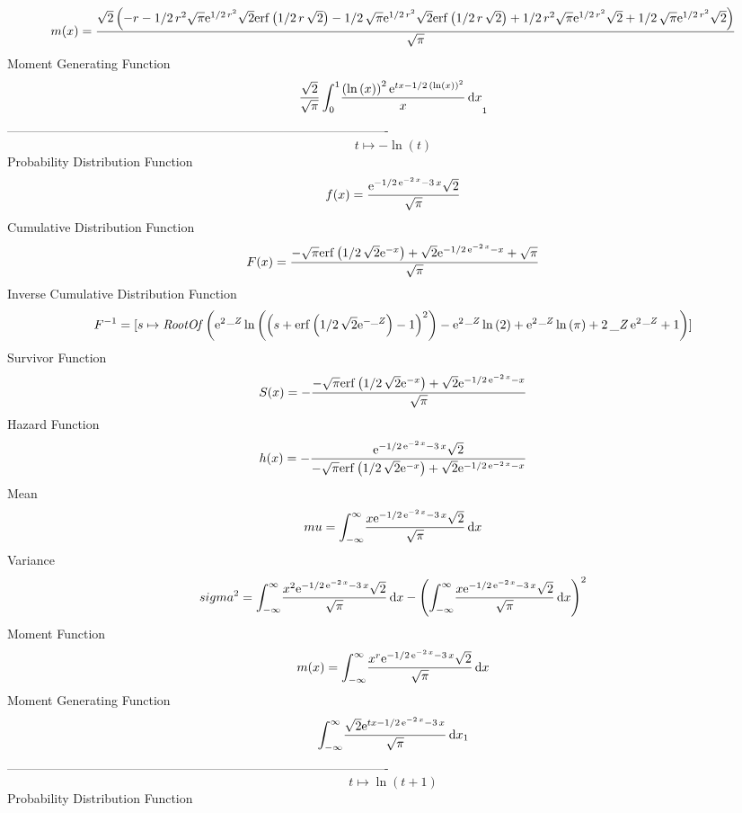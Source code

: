 \documentclass[12pt]{article}
\begin{document}
 $$ m(x) = {\frac {\sqrt {2} \left( -r-1/2\,{r}^{2}\sqrt {\pi}{{\rm e}^{1/2\,{r}^
{2}}}\sqrt {2}{\rm erf} \left(1/2\,r\,\sqrt {2}\right)-1/2\,\sqrt {\pi
}{{\rm e}^{1/2\,{r}^{2}}}\sqrt {2}{\rm erf} \left(1/2\,r\,\sqrt {2}
\right)+1/2\,{r}^{2}\sqrt {\pi}{{\rm e}^{1/2\,{r}^{2}}}\sqrt {2}+1/2\,
\sqrt {\pi}{{\rm e}^{1/2\,{r}^{2}}}\sqrt {2} \right) }{\sqrt {\pi}}}
$$ Moment Generating Function 
 $${\frac {\sqrt {2}}{\sqrt {\pi}}\int_{0}^{1}\!{\frac { \left( \ln 
 \left( x \right)  \right) ^{2}{{\rm e}^{tx-1/2\, \left( \ln  \left( x
 \right)  \right) ^{2}}}}{x}}\,{\rm d}x}_{{1}}
$$-------------------------------------------------------------------------------------------  \\$$t\mapsto -\ln  \left( t \right) 
$$Probability Distribution Function 
$$  f(x)={\frac {{{\rm e}^{-1/2\,{{\rm e}^{-2\,x}}-3\,x}}\sqrt {2}}{\sqrt {\pi}
}}
$$Cumulative Distribution Function  
 $$F(x)={\frac {-\sqrt {\pi}{\rm erf} \left(1/2\,\sqrt {2}{{\rm e}^{-x}}
\right)+\sqrt {2}{{\rm e}^{-1/2\,{{\rm e}^{-2\,x}}-x}}+\sqrt {\pi}}{
\sqrt {\pi}}}
$$ Inverse Cumulative Distribution Function 
  $$F^{-1} = [s\mapsto {\it RootOf} \left( {{\rm e}^{2\,{\it \_Z}}}\ln  \left( 
 \left( s+{\rm erf} \left(1/2\,\sqrt {2}{{\rm e}^{-{\it \_Z}}}\right)-
1 \right) ^{2} \right) -{{\rm e}^{2\,{\it \_Z}}}\ln  \left( 2 \right) 
+{{\rm e}^{2\,{\it \_Z}}}\ln  \left( \pi \right) +2\,{\it \_Z}\,{
{\rm e}^{2\,{\it \_Z}}}+1 \right) ]
$$Survivor Function 
 $$ S(x)=-{\frac {-\sqrt {\pi}{\rm erf} \left(1/2\,\sqrt {2}{{\rm e}^{-x}}
\right)+\sqrt {2}{{\rm e}^{-1/2\,{{\rm e}^{-2\,x}}-x}}}{\sqrt {\pi}}}
$$ Hazard Function 
 $$ h(x)=-{\frac {{{\rm e}^{-1/2\,{{\rm e}^{-2\,x}}-3\,x}}\sqrt {2}}{-\sqrt {
\pi}{\rm erf} \left(1/2\,\sqrt {2}{{\rm e}^{-x}}\right)+\sqrt {2}{
{\rm e}^{-1/2\,{{\rm e}^{-2\,x}}-x}}}}
$$Mean 
 $$ mu=\int_{-\infty }^{\infty }\!{\frac {x{{\rm e}^{-1/2\,{{\rm e}^{-2\,x}}-
3\,x}}\sqrt {2}}{\sqrt {\pi}}}\,{\rm d}x
$$ Variance 
 $$ sigma^2 = \int_{-\infty }^{\infty }\!{\frac {{x}^{2}{{\rm e}^{-1/2\,{{\rm e}^{-2
\,x}}-3\,x}}\sqrt {2}}{\sqrt {\pi}}}\,{\rm d}x- \left( \int_{-\infty }
^{\infty }\!{\frac {x{{\rm e}^{-1/2\,{{\rm e}^{-2\,x}}-3\,x}}\sqrt {2}
}{\sqrt {\pi}}}\,{\rm d}x \right) ^{2}
$$Moment Function 
 $$ m(x) = \int_{-\infty }^{\infty }\!{\frac {{x}^{r}{{\rm e}^{-1/2\,{{\rm e}^{-2
\,x}}-3\,x}}\sqrt {2}}{\sqrt {\pi}}}\,{\rm d}x
$$ Moment Generating Function 
 $$\int_{-\infty }^{\infty }\!{\frac {\sqrt {2}{{\rm e}^{tx-1/2\,{{\rm e}
^{-2\,x}}-3\,x}}}{\sqrt {\pi}}}\,{\rm d}x_{{1}}
$$-------------------------------------------------------------------------------------------  \\$$t\mapsto \ln  \left( t+1 \right) 
$$Probability Distribution Function 
\end{document}
